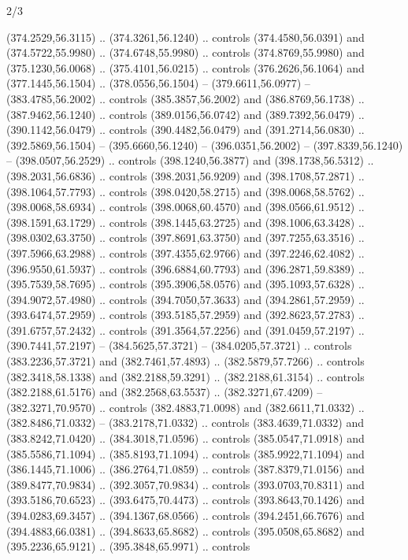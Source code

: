 \begin{flagdescription}{2/3}
\begin{scope}[xshift=0.5\flaglength,yshift=0.5\flagwidth,scale=\flagwidth/311.22]
\begin{scope}[y=0.8pt, x=0.8pt, yscale=-1,shift={(-291.77,-194.51)}]
  (374.2529,56.3115) .. (374.3261,56.1240) .. controls (374.4580,56.0391) and
  (374.5722,55.9980) .. (374.6748,55.9980) .. controls (374.8769,55.9980) and
  (375.1230,56.0068) .. (375.4101,56.0215) .. controls (376.2626,56.1064) and
  (377.1445,56.1504) .. (378.0556,56.1504) -- (379.6611,56.0977) --
  (383.4785,56.2002) .. controls (385.3857,56.2002) and (386.8769,56.1738) ..
  (387.9462,56.1240) .. controls (389.0156,56.0742) and (389.7392,56.0479) ..
  (390.1142,56.0479) .. controls (390.4482,56.0479) and (391.2714,56.0830) ..
  (392.5869,56.1504) -- (395.6660,56.1240) -- (396.0351,56.2002) --
  (397.8339,56.1240) -- (398.0507,56.2529) .. controls (398.1240,56.3877) and
  (398.1738,56.5312) .. (398.2031,56.6836) .. controls (398.2031,56.9209) and
  (398.1708,57.2871) .. (398.1064,57.7793) .. controls (398.0420,58.2715) and
  (398.0068,58.5762) .. (398.0068,58.6934) .. controls (398.0068,60.4570) and
  (398.0566,61.9512) .. (398.1591,63.1729) .. controls (398.1445,63.2725) and
  (398.1006,63.3428) .. (398.0302,63.3750) .. controls (397.8691,63.3750) and
  (397.7255,63.3516) .. (397.5966,63.2988) .. controls (397.4355,62.9766) and
  (397.2246,62.4082) .. (396.9550,61.5937) .. controls (396.6884,60.7793) and
  (396.2871,59.8389) .. (395.7539,58.7695) .. controls (395.3906,58.0576) and
  (395.1093,57.6328) .. (394.9072,57.4980) .. controls (394.7050,57.3633) and
  (394.2861,57.2959) .. (393.6474,57.2959) .. controls (393.5185,57.2959) and
  (392.8623,57.2783) .. (391.6757,57.2432) .. controls (391.3564,57.2256) and
  (391.0459,57.2197) .. (390.7441,57.2197) -- (384.5625,57.3721) --
  (384.0205,57.3721) .. controls (383.2236,57.3721) and (382.7461,57.4893) ..
  (382.5879,57.7266) .. controls (382.3418,58.1338) and (382.2188,59.3291) ..
  (382.2188,61.3154) .. controls (382.2188,61.5176) and (382.2568,63.5537) ..
  (382.3271,67.4209) -- (382.3271,70.9570) .. controls (382.4883,71.0098) and
  (382.6611,71.0332) .. (382.8486,71.0332) -- (383.2178,71.0332) .. controls
  (383.4639,71.0332) and (383.8242,71.0420) .. (384.3018,71.0596) .. controls
  (385.0547,71.0918) and (385.5586,71.1094) .. (385.8193,71.1094) .. controls
  (385.9922,71.1094) and (386.1445,71.1006) .. (386.2764,71.0859) .. controls
  (387.8379,71.0156) and (389.8477,70.9834) .. (392.3057,70.9834) .. controls
  (393.0703,70.8311) and (393.5186,70.6523) .. (393.6475,70.4473) .. controls
  (393.8643,70.1426) and (394.0283,69.3457) .. (394.1367,68.0566) .. controls
  (394.2451,66.7676) and (394.4883,66.0381) .. (394.8633,65.8682) .. controls
  (395.0508,65.8682) and (395.2236,65.9121) .. (395.3848,65.9971) .. controls

\end{scope}
\end{scope}
\end{flagdescription}
